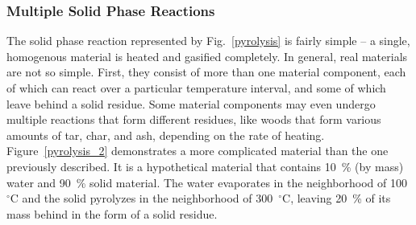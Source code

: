 \documentclass[11pt]{book}
\begin{document}
\subsubsection{Multiple Solid Phase Reactions}

The solid phase reaction represented by Fig.~\ref{pyrolysis} is fairly simple -- a single, homogenous material is
heated and gasified completely.
In general, real materials are not so simple. First, they consist of more than one material component, each of which can
react over a particular
temperature interval, and some of which leave behind a solid residue.
Some material components may even undergo multiple reactions that
form different residues, like woods that form various amounts of tar, char, and ash, depending on the rate of heating.
Figure~\ref{pyrolysis_2} demonstrates a more complicated material than the one previously described.
It is a hypothetical material that
contains 10~\% (by mass) water and 90~\% solid material. The water evaporates in the neighborhood of 100~$^\circ$C and the
solid pyrolyzes in the
neighborhood of 300~$^\circ$C, leaving 20~\% of its mass behind in the form of a solid residue.
\end{document}
